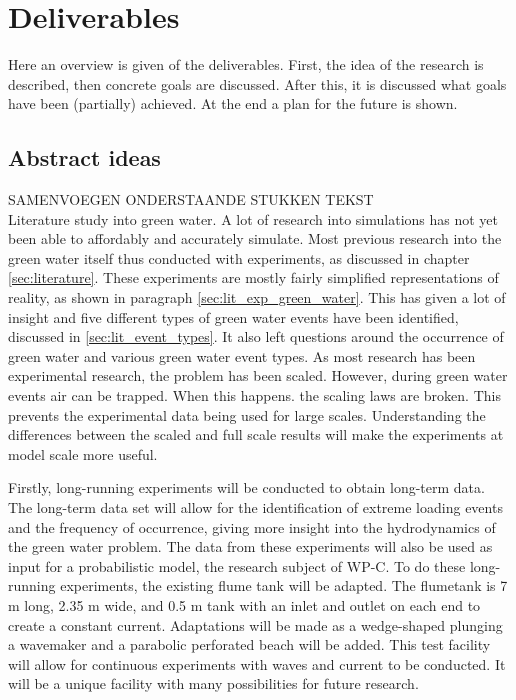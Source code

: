 \chapter{Deliverables}
\label{sec:deliverables}
Here an overview is given of the deliverables. First, the idea of the research is described, then concrete goals are discussed. After this, it is discussed what goals have been (partially) achieved. At the end a plan for the future is shown.


\section{Abstract ideas}
\label{sec:deliv_ideas}
SAMENVOEGEN ONDERSTAANDE STUKKEN TEKST \\
Literature study into green water. A lot of research into simulations has not yet been able to affordably and accurately simulate. Most previous research into the green water itself thus conducted with experiments, as discussed in chapter \ref{sec:literature}. These experiments are mostly fairly simplified representations of reality, as shown in paragraph \ref{sec:lit_exp_green_water}. This has given a lot of insight and five different types of green water events have been identified, discussed in \ref{sec:lit_event_types}. It also left questions around the occurrence of green water and various green water event types.
As most research has been experimental research, the problem has been scaled. However, during green water events air can be trapped. When this happens. the scaling laws are broken. This prevents the experimental data being used for large scales. Understanding the differences between the scaled and full scale results will make the experiments at model scale more useful.\par 

Firstly, long-running experiments will be conducted to obtain long-term data. The long-term data set will allow for the identification of extreme loading events and the frequency of occurrence, giving more insight
into the hydrodynamics of the green water problem. The data from these experiments will also be used as input for a probabilistic model, the research subject of WP-C. To do these long-running experiments, the existing flume tank will be adapted. The flumetank is 7 m long, 2.35 m wide, and 0.5 m tank with an inlet and outlet on each end to create a constant current. Adaptations will be made as a wedge-shaped plunging
a wavemaker and a parabolic perforated beach will be added. This test facility will allow for continuous experiments with waves and current to be conducted. It will be a unique facility with many possibilities for
future research. \par 

